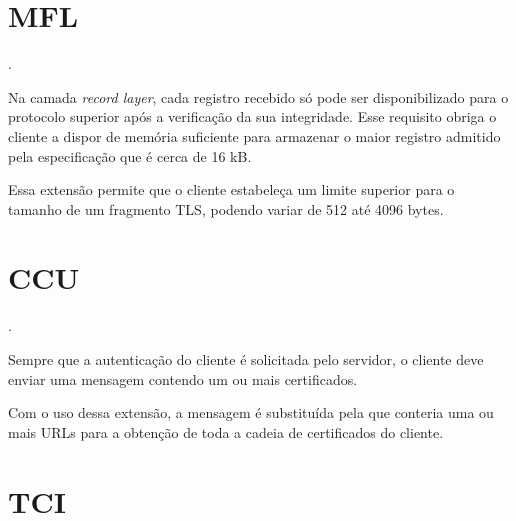 \section{\acf{MFL}}

\begin{description}[\breaklabel]

\item[Referência]
	.

\item[Sinopse]
	Na camada \emph{record layer}, cada registro recebido só pode ser disponibilizado
	para o protocolo superior após a verificação da sua integridade. Esse requisito
	obriga o cliente a dispor de memória suficiente para armazenar o maior registro 
	admitido pela especificação que é cerca de 16 kB.
	
\item[Propósito da Extensão]
	Essa extensão permite que o cliente estabeleça um limite superior para o tamanho de um 
	fragmento TLS, podendo variar de 512 até 4096 bytes.

\end{description}


\section{\acf{CCU}}

\begin{description}[\breaklabel]

\item[Referência]
	.

\item[Sinopse]
	Sempre que a autenticação do cliente é solicitada pelo servidor, o cliente deve
	enviar uma mensagem \tlsHsC contendo um ou mais certificados.
	
\item[Propósito da Extensão]
	Com o uso dessa extensão, a mensagem \tlsHsC é substituída pela \tlsHsCu que
	conteria uma ou mais \acsp{URL} para a obtenção de toda a cadeia de certificados do 
	cliente.

\end{description}


\section{\acf{TCI}}

